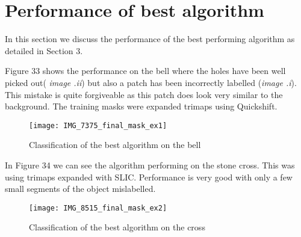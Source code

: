 \documentclass[12pt]{IIBproject}
\begin{document}
\section{Performance of best algorithm}
In this section we discuss the performance of the best performing algorithm as detailed in Section 3. 

Figure 33 shows the performance on the bell where the holes have been well picked out(\emph{ image .ii}) but also a patch has been incorrectly labelled (\emph{image .i}). This mistake is quite forgiveable as this patch does look very similar to the background. The training masks were expanded trimaps using Quickshift.
\begin{figure}[H]
  
  \centering
    \texttt{[image: IMG\_7375\_final\_mask\_ex1]}
    \caption{Classification of the best algorithm on the bell}
\end{figure}

In Figure 34 we can see the algorithm performing on the stone cross. This was using trimaps expanded with SLIC. Performance is very good with only a few small segments of the object mislabelled. 
\begin{figure}[H]
  
  \centering
    \texttt{[image: IMG\_8515\_final\_mask\_ex2]}
    \caption{Classification of the best algorithm on the cross}
\end{figure}
\end{document}
